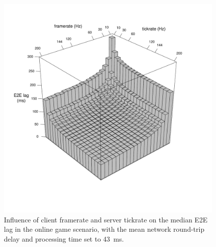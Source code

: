 \begin{figure}[!t]
	\centering
	\vspace{-6mm}
	\includegraphics[width=1.0\columnwidth]{../../simulation/visualization/e2e-lag-3dbars.pdf}
	\vspace{-15mm}
	\caption{Influence of client framerate and server tickrate on the median \gls{E2E} lag in the online game scenario, with the mean network round-trip delay and processing time set to \SI{43}{\ms}.}
\label{fig:3dbars-framerate-tickrate-lag}
\end{figure}

